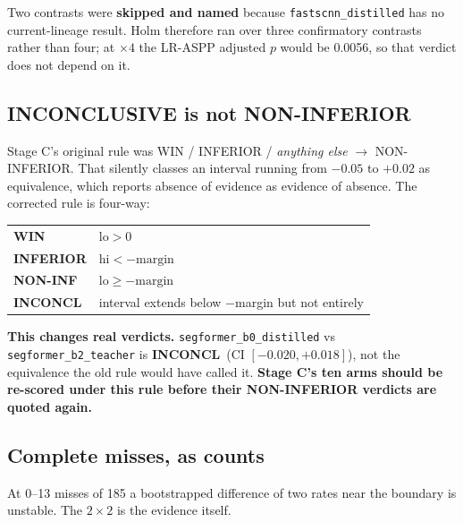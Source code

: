 \documentclass[11pt]{article}
\newcommand{\win}{\textcolor{wingreen}{\textbf{WIN}}}
\newcommand{\noninf}{\textcolor{secblue}{\textbf{NON-INF}}}
\newcommand{\inc}{\textcolor{warnamber}{\textbf{INCONCL}}}
\newcommand{\infr}{\textcolor{losered}{\textbf{INFERIOR}}}
\begin{document}
Two contrasts were \textbf{skipped and named} because
\texttt{fastscnn\_distilled} has no current-lineage result. Holm therefore ran
over three confirmatory contrasts rather than four; at $\times4$ the LR-ASPP
adjusted $p$ would be 0.0056, so that verdict does not depend on it.

\subsection{INCONCLUSIVE is not NON-INFERIOR}
\label{sec:inconclusive}

Stage C's original rule was WIN / INFERIOR / \emph{anything else}
$\rightarrow$ NON-INFERIOR. That silently classes an interval running from $-0.05$
to $+0.02$ as equivalence, which reports absence of evidence as evidence of
absence. The corrected rule is four-way:

\begin{center}
\begin{tabular}{ll}
\toprule
\win & $\mathrm{lo} > 0$ \\
\infr & $\mathrm{hi} < -\text{margin}$ \\
\noninf & $\mathrm{lo} \ge -\text{margin}$ \\
\inc & interval extends below $-$margin but not entirely \\
\bottomrule
\end{tabular}
\end{center}

\textbf{This changes real verdicts.} \texttt{segformer\_b0\_distilled} vs
\texttt{segformer\_b2\_teacher} is \inc\ (CI $[-0.020,+0.018]$), not the
equivalence the old rule would have called it. \textbf{Stage C's ten arms should be
re-scored under this rule before their NON-INFERIOR verdicts are quoted again.}

\subsection{Complete misses, as counts}

At 0--13 misses of 185 a bootstrapped difference of two rates near the boundary is
unstable. The $2\times2$ is the evidence itself.
\end{document}
